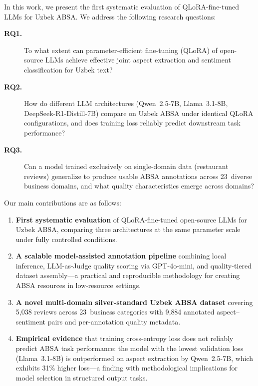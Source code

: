 \documentclass[runningheads]{llncs}
\begin{document}
In this work, we present the first systematic evaluation of QLoRA-fine-tuned LLMs for Uzbek ABSA. We address the following research questions:

\begin{description}
\item[\textbf{RQ1.}] To what extent can parameter-efficient fine-tuning (QLoRA) of open-source LLMs achieve effective joint aspect extraction and sentiment classification for Uzbek text?

\item[\textbf{RQ2.}] How do different LLM architectures (Qwen~2.5-7B, Llama~3.1-8B, DeepSeek-R1-Distill-7B) compare on Uzbek ABSA under identical QLoRA configurations, and does training loss reliably predict downstream task performance?

\item[\textbf{RQ3.}] Can a model trained exclusively on single-domain data (restaurant reviews) generalize to produce usable ABSA annotations across 23~diverse business domains, and what quality characteristics emerge across domains?
\end{description}

\noindent Our main contributions are as follows:

\begin{enumerate}
\item \textbf{First systematic evaluation} of QLoRA-fine-tuned open-source LLMs for Uzbek ABSA, comparing three architectures at the same parameter scale under fully controlled conditions.

\item \textbf{A scalable model-assisted annotation pipeline} combining local inference, LLM-as-Judge quality scoring via GPT-4o-mini, and quality-tiered dataset assembly---a practical and reproducible methodology for creating ABSA resources in low-resource settings.

\item \textbf{A novel multi-domain silver-standard Uzbek ABSA dataset} covering 5{,}038 reviews across 23~business categories with 9{,}884 annotated aspect--sentiment pairs and per-annotation quality metadata.

\item \textbf{Empirical evidence} that training cross-entropy loss does not reliably predict ABSA task performance: the model with the lowest validation loss (Llama~3.1-8B) is outperformed on aspect extraction by Qwen~2.5-7B, which exhibits 31\% higher loss---a finding with methodological implications for model selection in structured output tasks.
\end{enumerate}
\end{document}
